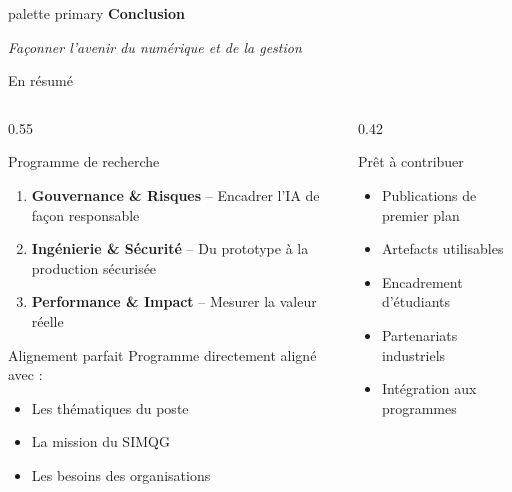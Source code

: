 \documentclass[aspectratio=169,11pt]{beamer}
\begin{document}
\begin{frame}{}
  \begin{beamercolorbox}[wd=\paperwidth,ht=2.5cm,dp=0.5cm,center]{palette primary}
    {\Large\bfseries Conclusion}
  \end{beamercolorbox}
  \vspace{2cm}
  \begin{center}
    {\large\textit{Façonner l'avenir du numérique et de la gestion}}
  \end{center}
\end{frame}

\begin{frame}{En résumé}
  \begin{columns}[T]
    \begin{column}{0.55\textwidth}
      \begin{block}{Programme de recherche}
        \begin{enumerate}\small
          \item \textcolor{axe1color}{\textbf{Gouvernance \& Risques}} -- Encadrer l'IA de façon responsable
          \item \textcolor{axe2color}{\textbf{Ingénierie \& Sécurité}} -- Du prototype à la production sécurisée
          \item \textcolor{axe3color}{\textbf{Performance \& Impact}} -- Mesurer la valeur réelle
        \end{enumerate}
      \end{block}
      
      \begin{alertblock}{Alignement parfait}
        \small Programme directement aligné avec :
        \begin{itemize}\small
          \item Les thématiques du poste
          \item La mission du SIMQG
          \item Les besoins des organisations
        \end{itemize}
      \end{alertblock}
    \end{column}
    \begin{column}{0.42\textwidth}
      \begin{exampleblock}{Prêt à contribuer}
        \begin{itemize}\small
          \item Publications de premier plan
          \item Artefacts utilisables
          \item Encadrement d'étudiants
          \item Partenariats industriels
          \item Intégration aux programmes
        \end{itemize}
      \end{exampleblock}
      

\end{column}
\end{columns}
\end{frame}
\end{document}
